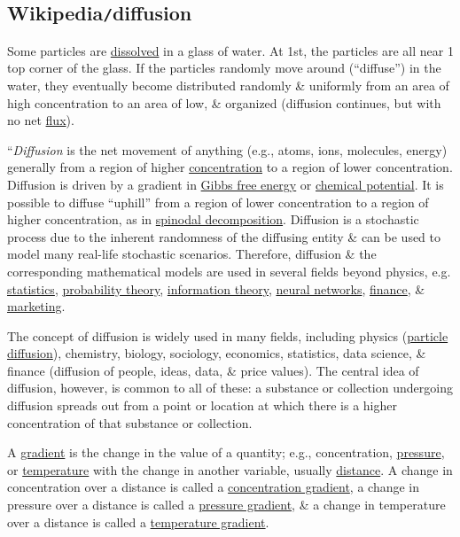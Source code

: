 \documentclass{article}
\begin{document}
\subsection{Wikipedia{\tt/}diffusion}
{\sf Some particles are \href{https://en.wikipedia.org/wiki/Dissolution_(chemistry)}{dissolved} in a glass of water. At 1st, the particles are all near 1 top corner of the glass. If the particles randomly move around (``diffuse'') in the water, they eventually become distributed randomly \& uniformly from an area of high concentration to an area of low, \& organized (diffusion continues, but with no net \href{https://en.wikipedia.org/wiki/Flux}{flux}).}

``{\it Diffusion} is the net movement of anything (e.g., atoms, ions, molecules, energy) generally from a region of higher \href{https://en.wikipedia.org/wiki/Concentration}{concentration} to a region of lower concentration. Diffusion is driven by a gradient in \href{https://en.wikipedia.org/wiki/Gibbs_free_energy}{Gibbs free energy} or \href{https://en.wikipedia.org/wiki/Chemical_potential}{chemical potential}. It is possible to diffuse ``uphill'' from a region of lower concentration to a region of higher concentration, as in \href{https://en.wikipedia.org/wiki/Spinodal_decomposition}{spinodal decomposition}. Diffusion is a stochastic process due to the inherent randomness of the diffusing entity \& can be used to model many real-life stochastic scenarios. Therefore, diffusion \& the corresponding mathematical models are used in several fields beyond physics, e.g. \href{https://en.wikipedia.org/wiki/Statistics}{statistics}, \href{https://en.wikipedia.org/wiki/Probability_theory}{probability theory}, \href{https://en.wikipedia.org/wiki/Information_theory}{information theory}, \href{https://en.wikipedia.org/wiki/Neural_networks}{neural networks}, \href{https://en.wikipedia.org/wiki/Finance}{finance}, \& \href{https://en.wikipedia.org/wiki/Marketing}{marketing}.

The concept of diffusion is widely used in many fields, including physics (\href{https://en.wikipedia.org/wiki/Molecular_diffusion}{particle diffusion}), chemistry, biology, sociology, economics, statistics, data science, \& finance (diffusion of people, ideas, data, \& price values). The central idea of diffusion, however, is common to all of these: a substance or collection undergoing diffusion spreads out from a point or location at which there is a higher concentration of that substance or collection.

A \href{https://en.wikipedia.org/wiki/Gradient}{gradient} is the change in the value of a quantity; e.g., concentration, \href{https://en.wikipedia.org/wiki/Pressure}{pressure}, or \href{https://en.wikipedia.org/wiki/Temperature}{temperature} with the change in another variable, usually \href{https://en.wikipedia.org/wiki/Distance}{distance}. A change in concentration over a distance is called a \href{https://en.wikipedia.org/wiki/Molecular_diffusion}{concentration gradient}, a change in pressure over a distance is called a \href{https://en.wikipedia.org/wiki/Pressure_gradient}{pressure gradient}, \& a change in temperature over a distance is called a \href{https://en.wikipedia.org/wiki/Temperature_gradient}{temperature gradient}.
\end{document}

